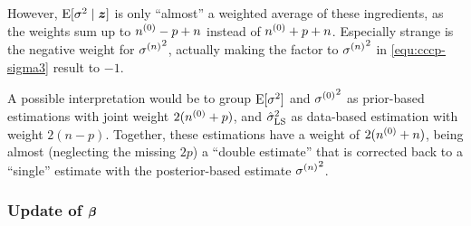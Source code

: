 However, $\operatorname{E}[\sigma^2\mid {\bm z}]$ is only ``almost'' a weighted average of these ingredients,
as the weights sum up to $n^{(0)} - p + n$ instead of $n^{(0)} + p + n$.
Especially strange is the negative weight for ${\sigma^{(n)}}^2$,
actually making the factor to ${\sigma^{(n)}}^2$ in \eqref{equ:cccp-sigma3} result to $-1$.

A possible interpretation would be to group $\operatorname{E}[\sigma^2]$ and ${\sigma^{(0)}}^2$
as prior-based estimations with joint weight $2(n^{(0)} + p)$,
and $\hat{\sigma}^2_\text{LS}$ as data-based estimation with weight $2(n-p)$.
Together, these estimations have a weight of $2(n^{(0)} + n)$,
being almost (neglecting the missing $2p$) a ``double estimate''
that is corrected back to a ``single'' estimate
with the posterior-based estimate ${\sigma^{(n)}}^2$.


\subsubsection{Update of \texorpdfstring{$\boldsymbol{\beta}$}{beta}}
\label{sec:cccp-update3}

